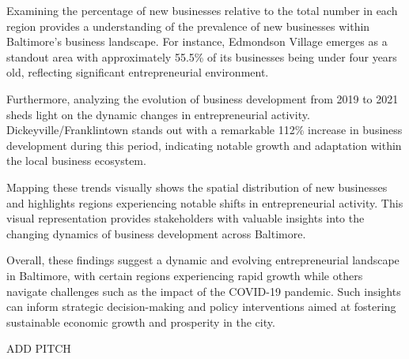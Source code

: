 \documentclass[
  letterpaper,
  DIV=11,
  numbers=noendperiod]{scrartcl}
\begin{document}
Examining the percentage of new businesses relative to the total number
in each region provides a understanding of the prevalence of new
businesses within Baltimore's business landscape. For instance,
Edmondson Village emerges as a standout area with approximately 55.5\%
of its businesses being under four years old, reflecting significant
entrepreneurial environment.

Furthermore, analyzing the evolution of business development from 2019
to 2021 sheds light on the dynamic changes in entrepreneurial activity.
Dickeyville/Franklintown stands out with a remarkable 112\% increase in
business development during this period, indicating notable growth and
adaptation within the local business ecosystem.

Mapping these trends visually shows the spatial distribution of new
businesses and highlights regions experiencing notable shifts in
entrepreneurial activity. This visual representation provides
stakeholders with valuable insights into the changing dynamics of
business development across Baltimore.

Overall, these findings suggest a dynamic and evolving entrepreneurial
landscape in Baltimore, with certain regions experiencing rapid growth
while others navigate challenges such as the impact of the COVID-19
pandemic. Such insights can inform strategic decision-making and policy
interventions aimed at fostering sustainable economic growth and
prosperity in the city.

ADD PITCH
\end{document}
